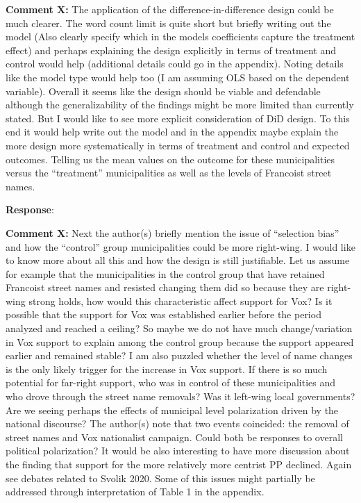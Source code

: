 \documentclass[12pt, a4paper, notitlepage]{article}
\begin{document}
\textbf{Comment X:} The application of the difference-in-difference design could be much clearer. The word count limit is quite short but briefly writing out the model (Also clearly specify which in the models coefficients capture the treatment effect) and perhaps explaining the design explicitly in terms of treatment and control would help (additional details could go in the appendix). Noting details like the model type would help too (I am assuming OLS based on the dependent variable). Overall it seems like the design should be viable and defendable although the generalizability of the findings might be more limited than currently stated. But I would like to see more explicit consideration of DiD design. To this end it would help write out the model and in the appendix maybe explain the more design more systematically in terms of treatment and control and expected outcomes. Telling us the mean values on the outcome for these municipalities versus the “treatment” municipalities as well as the levels of Francoist street names.

\textbf{Response}: {\color{red}{pending}}

\textbf{Comment X:} Next the author(s) briefly mention the issue of “selection bias” and how the “control” group municipalities could be more right-wing. I would like to know more about all this and how the design is still justifiable.  Let us assume for example that the municipalities in the control group that have retained Francoist street names and resisted changing them did so because they are right-wing strong holds, how would this characteristic affect support for Vox? Is it possible that the support for Vox was established earlier before the period analyzed and reached a ceiling? So maybe we do not have much change/variation in Vox support to explain among the control group because the support appeared earlier and remained stable? I am also puzzled whether the level of name changes is the only likely trigger for the increase in Vox support. If there is so much potential for far-right support, who was in control of these municipalities and who drove through the street name removals? Was it left-wing local governments? Are we seeing perhaps the effects of municipal level polarization driven by the national discourse? The author(s) note that two events coincided: the removal of street names and Vox nationalist campaign.  Could both be responses to overall political polarization? It would be also interesting to have more discussion about the finding that support for the more relatively more centrist PP declined. Again see debates related to Svolik 2020. Some of this issues might partially be addressed through interpretation of Table 1 in the appendix. 
\end{document}
